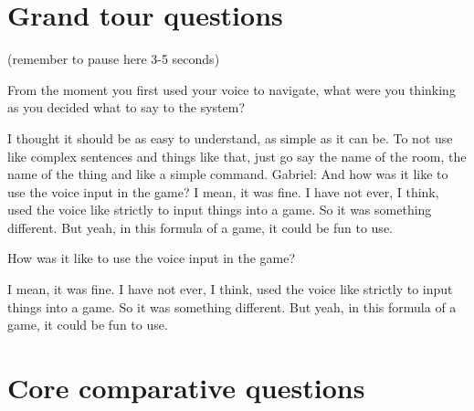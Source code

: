 \section{Grand tour questions}
(remember to pause here 3-5 seconds)

\begin{QandA}


   \item From the moment you first used your voice to navigate, what were you thinking as you decided what to say to the system?

         \begin{answered}
            I thought it should be as easy to understand, as simple as it can be.
            To not use like complex sentences and things like that, just go say the name of the room, the name of the thing and like a simple command.
            Gabriel: And how was it like to use the voice input in the game?
            I mean, it was fine.
            I have not ever, I think, used the voice like strictly to input things into a game.
            So it was something different.
            But yeah, in this formula of a game, it could be fun to use.
         \end{answered}

    \item How was it like to use the voice input in the game?
         \begin{answered}
            I mean, it was fine.
            I have not ever, I think, used the voice like strictly to input things into a game.
            So it was something different.
            But yeah, in this formula of a game, it could be fun to use.
         \end{answered}


\end{QandA}




\section{Core comparative questions}

